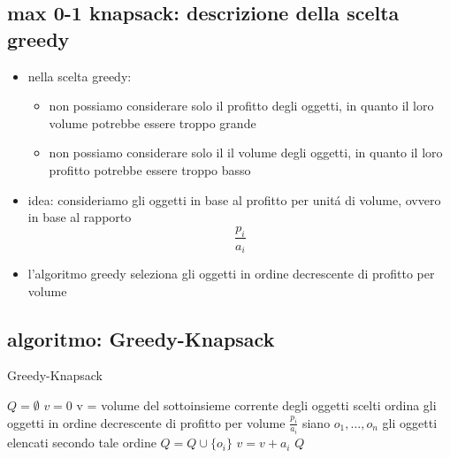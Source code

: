 
\subsection*{max 0-1 knapsack: descrizione della scelta greedy}
\begin{flushleft}
	\begin{itemize}
		\item nella scelta greedy:
		\begin{itemize}
			\item non possiamo considerare solo il profitto degli oggetti, in quanto il loro volume potrebbe essere troppo grande
			\item non possiamo considerare solo il il volume degli oggetti, in quanto il loro profitto potrebbe essere troppo basso
		\end{itemize}
		\item idea: consideriamo gli oggetti in base al profitto per unit\'a di volume, ovvero in base al rapporto $$\frac{p_i}{a_i}$$
		\item l'algoritmo greedy seleziona gli oggetti in ordine decrescente di profitto per volume
	\end{itemize}
\end{flushleft}


\newpage
\subsection*{algoritmo: Greedy-Knapsack}
\begin{flushleft}
	\begin{algorithm}
		\caption{Greedy-Knapsack}
		\begin{algorithmic}
			\STATE $Q=\emptyset$
			\STATE $v=0$
			\color{gray}
			\hfill v = volume del sottoinsieme corrente degli oggetti scelti
			\color{black}
			\STATE ordina gli oggetti in ordine decrescente di profitto per volume $\frac{p_i}{a_i}$
			\STATE siano $o_1,\ldots,o_n$ gli oggetti elencati secondo tale ordine
					\STATE $Q=Q\cup\{o_i\}$
					\STATE $v=v+a_i$
				\ENDIF
			\ENDFOR
			\RETURN $Q$
		\end{algorithmic}
	\end{algorithm}
\end{flushleft}

